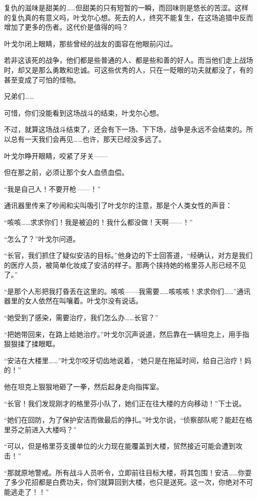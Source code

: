 复仇的滋味是甜美的……但甜美的只有短暂的一瞬，而回味则是悠长的苦涩。这样的复仇真的有意义吗，叶戈尔心想。死去的人，终究不能复生，在这场追猎中反而增加了更多的伤者。这代价是值得的吗？

叶戈尔闭上眼睛，那些曾经的战友的面容在他眼前闪过。

若非这该死的战争，他们都是些普通的人、都是些和善的好人。而当他们走上战场时，却又是那么勇敢和忠诚。可这些优秀的人，只在一眨眼的功夫就都没了，有的甚至变成了可怕的怪物。

兄弟们……

可惜，你们没能看到这场战斗的结束，叶戈尔心想。

不过，就算这场战斗结束了，还会有下一场、下下场，战争是永远不会结束的。所以总有一天我们会再见……也许，那天已经没多远了。

叶戈尔睁开眼睛，咬紧了牙关——

但在那之前，必须让那个女人血债血偿。

“我是自己人！不要开枪——！”

通讯器里传来了吵闹和尖叫吸引了叶戈尔的注意，那是个人类女性的声音：

“咳咳……求求你们！我是被迫的！我什么都没做！天啊——！”

“怎么了？”叶戈尔问道。

“长官，我们抓住了疑似安洁的目标。”他身边的下士回答道，“经确认，对方是我们的医疗人员，被简单化妆成了安洁的样子。那两个挟持她的格里芬人形已经不见了。”

“是那个人形把我打昏丢在这里的。咳咳——我需要……咳咳咳！求求你们……”通讯器里的女人依然在叫嚷着。叶戈尔没有说话。

“她受到了感染，需要治疗，我们怎么办……长官？”

“把她带回来，在路上给她治疗。”叶戈尔沉声说道，然后靠在一辆坦克上，用手指狠狠揉了揉眼眶。

“安洁在大楼里……”叶戈尔咬牙切齿地说着，“她只是在拖延时间，给自己治疗！妈的！”

他在坦克上狠狠地砸了一拳，然后起身走向指挥室。

“长官！我们发现刚才的格里芬小队了，她们正在往大楼的方向移动！”下士说。

“她们在回防，为了保护安洁而做最后的挣扎。”叶戈尔说，“侦察部队呢？能赶在格里芬之前进入大楼吗？”

“可以，但是格里芬支援单位的火力现在能覆盖到大楼，贸然接近可能会遭到攻击！”

“那就原地警戒。所有战斗人员听令，立即前往目标大楼，将其包围！安洁……你耍了多少花招都是白费功夫，你们就算回到大楼，也只是送死。这一次，你绝对不可能逃走了！！”

